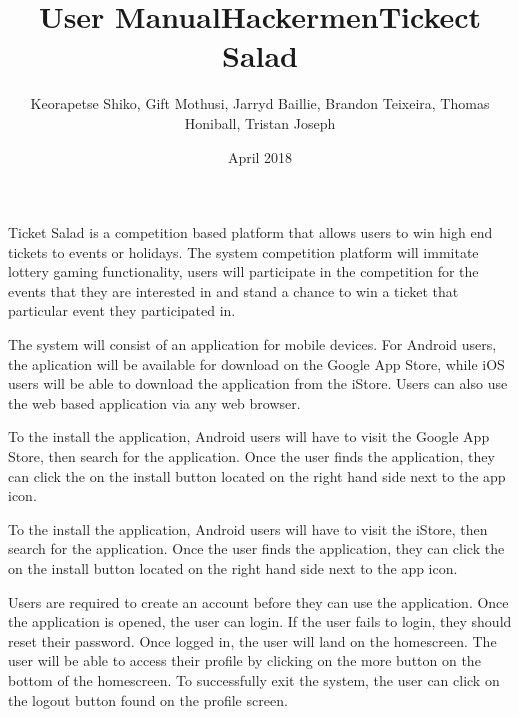 
\title{User Manual}
\title{Hackermen}
\title{Tickect Salad}

\author{Keorapetse Shiko, Gift Mothusi, Jarryd Baillie, Brandon Teixeira, Thomas Honiball, Tristan Joseph}
\date{April 2018}


    
\maketitle

Ticket Salad is a competition based platform that allows users to win high end tickets to events or holidays.
The system competition platform will immitate lottery gaming functionality, users will participate in the
 competition for the events that they are interested in and stand a chance to win a ticket that particular
 event they participated in.




The system will consist of an application for mobile devices. For Android users, the aplication will be available
for download on the Google App Store, while iOS users will be able to download the application from the iStore.
Users can also use the web based application via any web browser.

To the install the application, Android users will have to visit the Google App Store, then search for the application.
 Once the user finds the application, they can click the on the install button located on the right hand side next to the app icon.  


 To the install the application, Android users will have to visit the iStore, then search for the application.
 Once the user finds the application, they can click the on the install button located on the right hand side next to the app icon. 



 Users are required to create an account before they can use the application.
Once the application is opened, the user can login. If the user fails to login,
they should reset their password. Once logged in, the user will land on the homescreen.
The user will be able to access their profile by clicking on the more button on the 
bottom of the homescreen. To successfully exit the system, the user can click on the 
logout button found on the profile screen.



